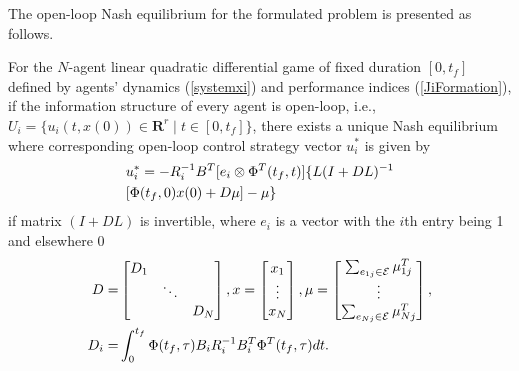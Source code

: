 \documentclass[10pt,doublecolumn]{IEEEtran}  %
\begin{document}
The open-loop Nash equilibrium for the formulated problem is presented as follows.
\begin{thm}
For the $N$-agent linear quadratic differential game of fixed duration $[0,t_f]$ defined by agents' dynamics (\ref{systemxi}) and performance indices (\ref{JiFormation}), if the information structure of every agent is open-loop, i.e., $U_i=\{u_i(t,x(0))\in \mathbf{R}^r \mid t\in[0,t_f]\}$, there exists a unique Nash equilibrium where corresponding open-loop control strategy vector $u^*_i$ is given by
\begin{align}
&u_i^*=-R_i^{-1}B^T [e_i\otimes\Phi^T(t_f,t)] \{L(I+DL)^{-1}\notag\\
&[\Phi(t_f,0)x(0)+D\mu]-\mu\}\label{uNash}
\end{align}
if matrix $(I+DL)$ is invertible, where $e_i$ is a vector with the $i$th entry being 1 and elsewhere 0
\begin{align}
D=&\begin{bmatrix}
D_1&&\\
&\ddots&\\
&&D_N
\end{bmatrix},
x=\begin{bmatrix}
x_1\\
\vdots\\
 x_N
\end{bmatrix},
\mu=\begin{bmatrix}
\sum_{e_{1j}\in{\mathcal{E}}}\mu^T_{1j}\\
\vdots\\
\sum_{e_{Nj}\in{\mathcal{E}}}\mu^T_{Nj}
\end{bmatrix},\notag\\
D_i=&\int^{t_f}_0\Phi(t_f,\tau)B_iR_i^{-1}B_i^T\Phi^T(t_f,\tau) dt
.\label{Di} 
\end{align}
\end{thm}
\end{document}
